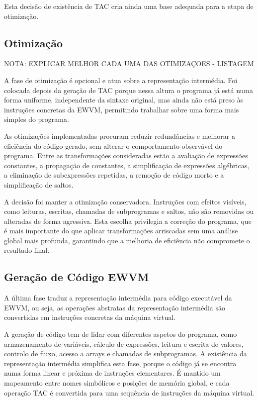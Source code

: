 \documentclass[11pt,a4paper]{report}
\begin{document}
Esta decisão de existência de TAC cria ainda uma base adequada para a etapa de otimização.

\subsection{Otimização}

NOTA: EXPLICAR MELHOR CADA UMA DAS OTIMIZAÇOES - LISTAGEM

A fase de otimização é opcional e atua sobre a representação intermédia. Foi colocada depois da geração de TAC porque nessa altura o programa já está numa forma uniforme, independente da sintaxe original, mas ainda não está preso às instruções concretas da EWVM, permitindo trabalhar sobre uma forma mais simples do programa.

As otimizações implementadas procuram reduzir redundâncias e melhorar a eficiência do código gerado, sem alterar o comportamento observável do programa. Entre as transformações consideradas estão a avaliação de expressões constantes, a propagação de constantes, a simplificação de expressões algébricas, a eliminação de subexpressões repetidas, a remoção de código morto e a simplificação de saltos. 

A decisão foi manter a otimização conservadora. Instruções com efeitos visíveis, como leituras, escritas, chamadas de subprogramas e saltos, não são removidas ou alteradas de forma agressiva. Esta escolha privilegia a correção do programa,  que é mais importante do que aplicar transformações arriscadas sem uma análise global mais profunda, garantindo que a melhoria de eficiência não compromete o resultado final.

\subsection{Geração de Código EWVM}

A última fase traduz a representação intermédia para código executável da EWVM, ou seja, as operações abstratas da representação intermédia são convertidas em instruções concretas da máquina virtual.

A geração de código tem de lidar com diferentes aspetos do programa, como armazenamento de variáveis, cálculo de expressões, leitura e escrita de valores, controlo de fluxo, acesso a arrays e chamadas de subprogramas. A existência da representação intermédia simplifica esta fase, porque o código já se encontra numa forma linear e próxima de instruções elementares. É mantido um mapeamento entre nomes simbólicos e posições de memória global, e cada operação TAC é convertida para uma sequência de instruções da máquina virtual.
\end{document}
